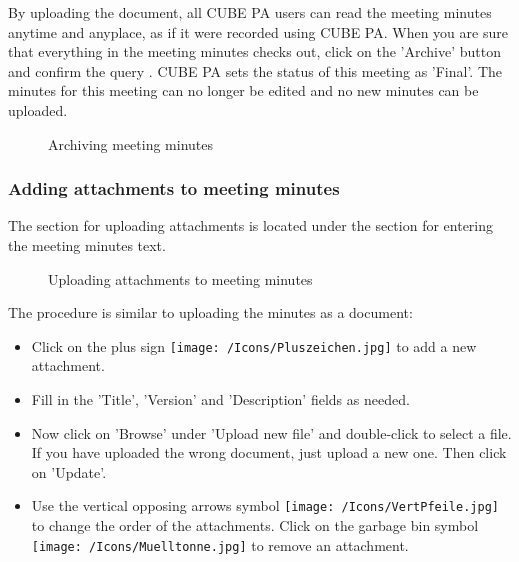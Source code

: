 \vspace{\baselineskip}

By uploading the document, all CUBE PA users can read the meeting minutes anytime and anyplace, as if it were recorded using CUBE PA. When you are sure that everything in the meeting minutes checks out, click on the 'Archive' button  and confirm the query . CUBE PA sets the status of this meeting as 'Final'. The minutes for this meeting can no longer be edited and no new minutes can be uploaded.

\begin{figure}[H]
\caption{Archiving meeting minutes}
\end{figure}

\subsubsection{Adding attachments to meeting minutes}

The section for uploading attachments is located under the section for entering the meeting minutes text.

\begin{figure}[H]
\caption{Uploading attachments to meeting minutes}
\end{figure}

The procedure is similar to uploading the minutes as a document:

\begin{itemize}
\item
Click on the plus sign \texttt{[image: /Icons/Pluszeichen.jpg]}  to add a new attachment.
\item
Fill in the 'Title', 'Version' and 'Description' fields  as needed.
\item
Now click on 'Browse'  under 'Upload new file' and double-click to select a file. If you have uploaded the wrong document, just upload a new one. Then click on 'Update'.
\item
Use the vertical opposing arrows symbol \texttt{[image: /Icons/VertPfeile.jpg]}  to change the order of the attachments. Click on the garbage bin symbol \texttt{[image: /Icons/Muelltonne.jpg]}  to remove an attachment.
\end{itemize}

